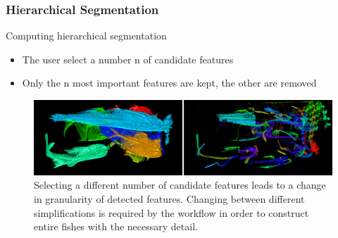 \documentclass[9pt]{beamer}
\begin{document}
\begin{frame}
\frametitle{Hierarchical Segmentation}
\begin{block}{Computing hierarchical segmentation}
\begin{itemize}
\item The user select a number n of candidate features
\item Only the n most important features are kept, the other are removed
\end{itemize}
\end{block}
\begin{figure}
\includegraphics[scale=0.2]{Images/features_simplification}
\caption{Selecting a different number of candidate features leads to a change in granularity of detected features. Changing between different simplifications is required by the workflow in order to construct entire fishes with the necessary detail.}
\end{figure}
\end{frame}
\end{document}
